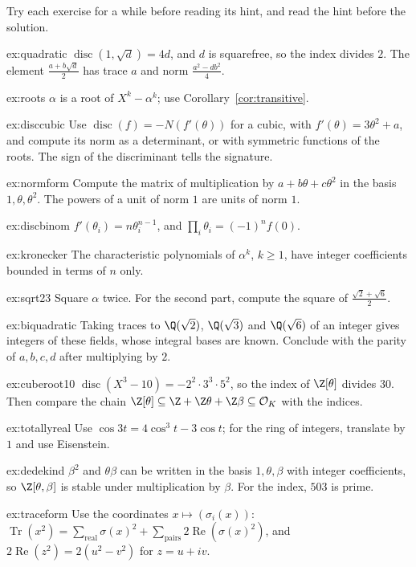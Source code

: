 Try each exercise for a while before reading its hint, and read the hint before the solution.

\begin{hint}{ex:quadratic}
$\operatorname{disc}(1,\sqrt d)=4d$, and $d$ is squarefree, so the index divides $2$. The element
$\frac{a+b\sqrt d}2$ has trace $a$ and norm $\frac{a^2-db^2}4$.
\end{hint}
\begin{hint}{ex:roots}
$\alpha$ is a root of $X^k-\alpha^k$; use Corollary~\ref{cor:transitive}.
\end{hint}
\begin{hint}{ex:disccubic}
Use $\operatorname{disc}(f)=-N(f'(\theta))$ for a cubic, with $f'(\theta)=3\theta^2+a$, and compute its norm as a
determinant, or with symmetric functions of the roots. The sign of the discriminant tells the signature.
\end{hint}
\begin{hint}{ex:normform}
Compute the matrix of multiplication by $a+b\theta+c\theta^2$ in the basis $1,\theta,\theta^2$. The powers of a unit of
norm $1$ are units of norm $1$.
\end{hint}
\begin{hint}{ex:discbinom}
$f'(\theta_i)=n\theta_i^{n-1}$, and $\prod_i\theta_i=(-1)^nf(0)$.
\end{hint}
\begin{hint}{ex:kronecker}
The characteristic polynomials of $\alpha^k$, $k\ge1$, have integer coefficients bounded in terms of $n$ only.
\end{hint}
\begin{hint}{ex:sqrt23}
Square $\alpha$ twice. For the second part, compute the square of $\frac{\sqrt2+\sqrt6}2$.
\end{hint}
\begin{hint}{ex:biquadratic}
Taking traces to $\Q(\sqrt2)$, $\Q(\sqrt3)$ and $\Q(\sqrt6)$ of an integer gives integers of these fields, whose
integral bases are known. Conclude with the parity of $a,b,c,d$ after multiplying by $2$.
\end{hint}
\begin{hint}{ex:cuberoot10}
$\operatorname{disc}(X^3-10)=-2^2\cdot3^3\cdot5^2$, so the index of $\Z[\theta]$ divides $30$. Then compare the chain
$\Z[\theta]\subseteq\Z+\Z\theta+\Z\beta\subseteq\mathcal O_K$ with the indices.
\end{hint}
\begin{hint}{ex:totallyreal}
Use $\cos3t=4\cos^3t-3\cos t$; for the ring of integers, translate by $1$ and use Eisenstein.
\end{hint}
\begin{hint}{ex:dedekind}
$\beta^2$ and $\theta\beta$ can be written in the basis $1,\theta,\beta$ with integer coefficients, so
$\Z[\theta,\beta]$ is stable under multiplication by $\beta$. For the index, $503$ is prime.
\end{hint}
\begin{hint}{ex:traceform}
Use the coordinates $x\mapsto(\sigma_i(x))$: $\operatorname{Tr}(x^2)=\sum_{\text{real}}\sigma(x)^2+
\sum_{\text{pairs}}2\operatorname{Re}(\sigma(x)^2)$, and $2\operatorname{Re}(z^2)=2(u^2-v^2)$ for $z=u+iv$.
\end{hint}

